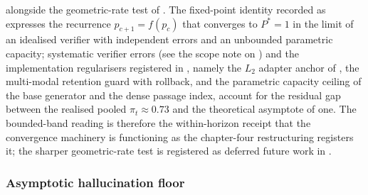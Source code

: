  alongside the geometric-rate test of . The fixed-point identity recorded as  expresses the recurrence $p_{c+1} = f(p_c)$ that converges to $P^* = 1$ in the limit of an idealised verifier with independent errors and an unbounded parametric capacity; systematic verifier errors (see the scope note on ) and the implementation regularisers registered in , namely the $L_2$ adapter anchor of , the multi-modal retention guard with rollback, and the parametric capacity ceiling of the base generator and the dense passage index, account for the residual gap between the realised pooled $\pi_t \approx 0.73$ and the theoretical asymptote of one. The bounded-band reading is therefore the within-horizon receipt that the convergence machinery is functioning as the chapter-four restructuring registers it; the sharper geometric-rate test is registered as deferred future work in .



\subsubsection{Asymptotic hallucination floor}
\label{sec:check-asymptotic}

